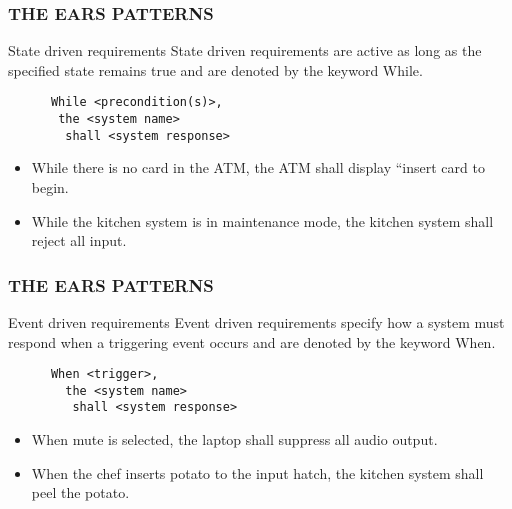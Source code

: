 \documentclass[aspectratio=169]{beamer}
\begin{document}
\begin{frame}[fragile]
  \frametitle{THE EARS PATTERNS}
  \begin{block}{State driven requirements}
  State driven requirements are active as long as the specified state remains true and are denoted by the keyword While.
    \begin{verbatim}
      While <precondition(s)>, 
       the <system name> 
        shall <system response>
    \end{verbatim}  
  \end{block}
  
  \begin{example}
  \begin{itemize}
    \item While there is no card in the ATM, the ATM shall display “insert card to begin.
    \item While the kitchen system is in maintenance mode, the kitchen system shall reject all input.
  \end{itemize}
  \end{example}

\end{frame}

\begin{frame}[fragile]
  \frametitle{THE EARS PATTERNS}
  \begin{block}{Event driven requirements}
  Event driven requirements specify how a system must respond when a triggering event occurs and are denoted by the keyword When.
    \begin{verbatim}
      When <trigger>, 
        the <system name> 
         shall <system response>
    \end{verbatim}
  \end{block}
  
  \begin{example}
  \begin{itemize}
    \item When mute is selected, the laptop shall suppress all audio output.
    \item When the chef inserts potato to the input hatch, the kitchen system shall peel the potato.
  \end{itemize}
  \end{example}
\end{frame}
\end{document}
